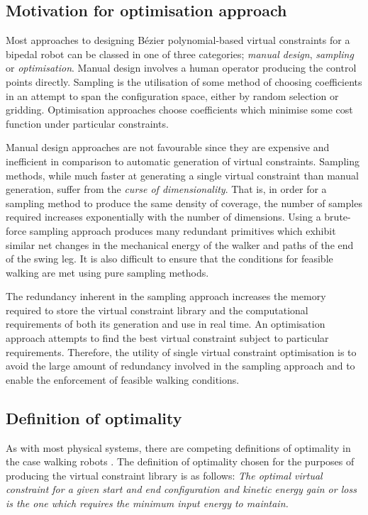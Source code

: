 \subsection{Motivation for optimisation approach}
Most approaches to designing Bézier polynomial-based virtual constraints for a bipedal robot can be classed in one of three categories; \textit{manual design}, \textit{sampling} or \textit{optimisation}. Manual design involves a human operator producing the control points directly. Sampling is the utilisation of some method of choosing coefficients in an attempt to span the configuration space, either by random selection or gridding. Optimisation approaches choose coefficients which minimise some cost function under particular constraints.

Manual design approaches are not favourable since they are expensive and inefficient in comparison to automatic generation of virtual constraints. Sampling methods, while much faster at generating a single virtual constraint than manual generation, suffer from the \textit{curse of dimensionality}. That is, in order for a sampling method to produce the same density of coverage, the number of samples required increases exponentially with the number of dimensions. Using a brute-force sampling approach produces many redundant primitives which exhibit similar net changes in the mechanical energy of the walker and paths of the end of the swing leg. It is also difficult to ensure that the conditions for feasible walking are met using pure sampling methods.

The redundancy inherent in the sampling approach increases the memory required to store the virtual constraint library and the computational requirements of both its generation and use in real time. An optimisation approach attempts to find the best virtual constraint subject to particular requirements. Therefore, the utility of single virtual constraint optimisation is to avoid the large amount of redundancy involved in the sampling approach and to enable the enforcement of feasible walking conditions.

\subsection{Definition of optimality}
As with most physical systems, there are competing definitions of optimality in the case walking robots \cite{sreenath2011compliant, westervelt2003hybrid, hurmuzlu2004modeling}. The definition of optimality chosen for the purposes of producing the virtual constraint library is as follows:
\emph{The optimal virtual constraint for a given start and end configuration and kinetic energy gain or loss is the one which requires the minimum input energy to maintain.}

